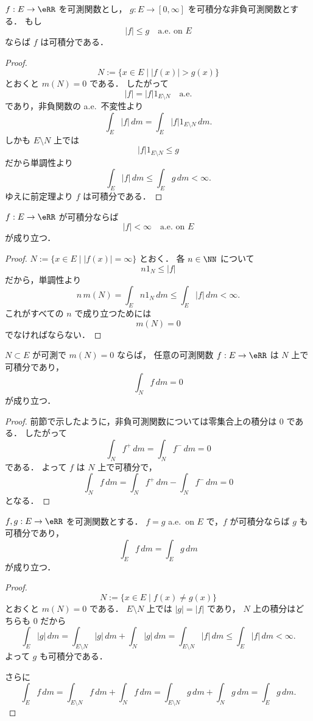 \begin{corollary}[優関数による可積分性の判定]
$f:E \to \eRR$ を可測関数とし，
$g:E \to [0,\infty]$ を可積分な非負可測関数とする．
もし
\[
|f|\le g \quad \text{a.e.\ on } E
\]
ならば $f$ は可積分である．
\end{corollary}
\begin{proof}
\[
N:=\{x \in E \mid |f(x)|>g(x)\}
\]
とおくと $m(N)=0$ である．
したがって
\[
|f|=|f|1_{E\setminus N}\quad \text{a.e.}
\]
であり，非負関数の a.e.\ 不変性より
\[
\int_E |f|\,dm
=
\int_E |f|1_{E\setminus N}\,dm.
\]
しかも $E\setminus N$ 上では
\[
|f|1_{E\setminus N}\le g
\]
だから単調性より
\[
\int_E |f|\,dm
\le
\int_E g\,dm
<
\infty.
\]
ゆえに前定理より $f$ は可積分である．
\end{proof}

\begin{corollary}
$f:E \to \eRR$ が可積分ならば
\[
|f|<\infty \quad \text{a.e.\ on } E
\]
が成り立つ．
\end{corollary}
\begin{proof}
$N:=\{x \in E \mid |f(x)|=\infty\}$ とおく．
各 $n \in \NN$ について
\[
n1_N\le |f|
\]
だから，単調性より
\[
n\,m(N)=\int_E n1_N\,dm \le \int_E |f|\,dm<\infty.
\]
これがすべての $n$ で成り立つためには
\[
m(N)=0
\]
でなければならない．
\end{proof}

\begin{proposition}[零集合上の任意の関数]
$N \subset E$ が可測で $m(N)=0$ ならば，
任意の可測関数 $f:E \to \eRR$ は $N$ 上で可積分であり，
\[
\int_N f\,dm=0
\]
が成り立つ．
\end{proposition}
\begin{proof}
前節で示したように，非負可測関数については零集合上の積分は $0$ である．
したがって
\[
\int_N f^+\,dm=\int_N f^-\,dm=0
\]
である．
よって $f$ は $N$ 上で可積分で，
\[
\int_N f\,dm
=
\int_N f^+\,dm-\int_N f^-\,dm
=
0
\]
となる．
\end{proof}

\begin{proposition}
$f,g:E \to \eRR$ を可測関数とする．
$f=g$ a.e.\ on $E$ で，$f$ が可積分ならば $g$ も可積分であり，
\[
\int_E f\,dm=\int_E g\,dm
\]
が成り立つ．
\end{proposition}
\begin{proof}
\[
N:=\{x \in E \mid f(x)\ne g(x)\}
\]
とおくと $m(N)=0$ である．
$E\setminus N$ 上では $|g|=|f|$ であり，
$N$ 上の積分はどちらも $0$ だから
\[
\int_E |g|\,dm
=
\int_{E\setminus N}|g|\,dm+\int_N |g|\,dm
=
\int_{E\setminus N}|f|\,dm
\le
\int_E |f|\,dm
<
\infty.
\]
よって $g$ も可積分である．

さらに
\[
\int_E f\,dm
=
\int_{E\setminus N} f\,dm+\int_N f\,dm
=
\int_{E\setminus N} g\,dm+\int_N g\,dm
=
\int_E g\,dm.
\]
\end{proof}

